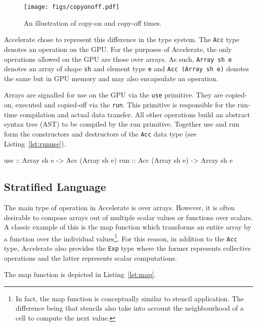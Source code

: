 \documentclass[12pt,a4paper,twoside]{scrbook}
\begin{document}
\begin{figure}
  \texttt{[image: figs/copyonoff.pdf]}
  \caption{An illustration of copy-on and copy-off times.}
  \label{fig:copyonoff}
\end{figure}

Accelerate chose to represent this difference in the type system. The
\texttt{Acc} type denotes an operation on the GPU. For the purposes of
Accelerate, the only operations allowed on the GPU are those over arrays. As
such, \texttt{Array sh e} denotes an array of shape \texttt{sh} and element type
\texttt{e} and \texttt{Acc (Array sh e)} denotes the same but in GPU memory and
may also encapsulate an operation.

Arrays are signalled for use on the GPU via the \texttt{use} primitive.  They
are copied-on, executed and copied-off via the \texttt{run}. This primitive is
responsible for the run-time compilation and actual data transfer. All other
operations build an abstract syntax tree (AST) to be compiled by the run
primitive. Together use and run form the constructors and destructors of the
\texttt{Acc} data type (see Listing~\ref{lst:runuse}).

\begin{hflisting}[label={lst:runuse}, caption=The basic constructors and
  destructors for moving arrays too and from the GPU in Accelerate.]
use :: Array sh e -> Acc (Array sh e)
run :: Acc (Array sh e) -> Array sh e
\end{hflisting}

\subsection{Stratified Language}

The main type of operation in Accelerate is over arrays. However, it is often
desirable to compose arrays out of multiple scalar values or functions over
scalars. A classic example of this is the map function which transforms an
entire array by a function over the individual values\footnote{In fact, the map
  function is conceptually similar to stencil application. The difference being
  that stencils also take into account the neighbourhood of a cell to compute
  the next value.}. For this reason, in addition to the \texttt{Acc} type,
Accelerate also provides the \texttt{Exp} type where the former represents
collective operations and the latter represents scalar computations.

The map function is depicted in Listing~\ref{lst:map}.
\end{document}
